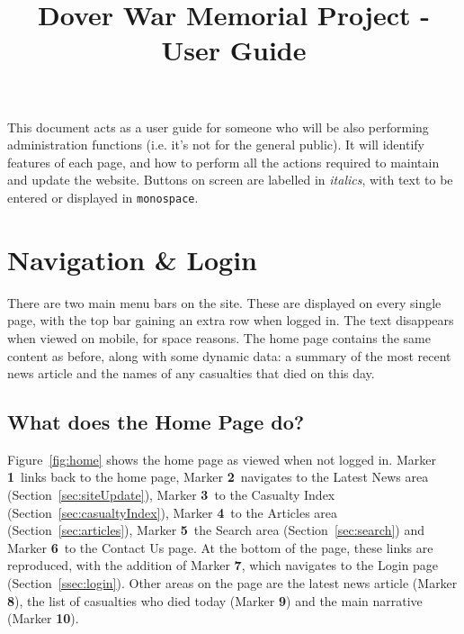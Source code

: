 \documentclass[12pt]{article}
\title{\vspace{-1cm}\textbf{Dover War Memorial Project - User Guide}\vspace{-1cm}}
\date{}
\author{}
\newcommand{\marker}[1]{Marker \color{red}\textbf{#1}\color{black}}
\begin{document}
\maketitle

This document acts as a user guide for someone who will be also performing administration functions (i.e. it's not for the general public). It will identify features of each page, and how to perform all the actions required to maintain and update the website. Buttons on screen are labelled in \textit{italics}, with text to be entered or displayed in \texttt{monospace}.

\tableofcontents
\newpage

\section{Navigation \& Login}
There are two main menu bars on the site. These are displayed on every single page, with the top bar gaining an extra row when logged in. The text disappears when viewed on mobile, for space reasons. The home page contains the same content as before, along with some dynamic data: a summary of the most recent news article and the names of any casualties that died on this day.

\subsection{What does the Home Page do?}
Figure~\ref{fig:home} shows the home page as viewed when not logged in. \marker{1}\ links back to the home page, \marker{2}\ navigates to the Latest News area (Section~\ref{sec:siteUpdate}), \marker{3}\ to the Casualty Index (Section~\ref{sec:casualtyIndex}), \marker{4}\ to the Articles area (Section~\ref{sec:articles}), \marker{5}\ the Search area (Section~\ref{sec:search}) and \marker{6}\ to the Contact Us page. At the bottom of the page, these links are reproduced, with the addition of \marker{7}, which navigates to the Login page (Section~\ref{ssec:login}). Other areas on the page are the latest news article (\marker{8}), the list of casualties who died today (\marker{9}) and the main narrative (\marker{10}).
\end{document}
